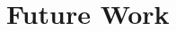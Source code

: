 \documentclass{llncs}
\begin{document}
\section{Future Work}

\begin{thebibliography}{0}






\end{thebibliography}
\end{document}
